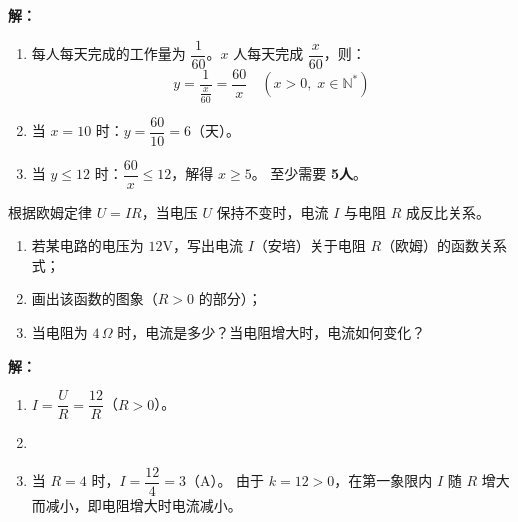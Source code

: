 \documentclass[12pt, a4paper]{ctexart}
\begin{document}
\textbf{解：}
\begin{enumerate}[label=(\arabic*)]
  \item 每人每天完成的工作量为 $\dfrac{1}{60}$。$x$ 人每天完成 $\dfrac{x}{60}$，则：
  \[
    y = \frac{1}{\frac{x}{60}} = \frac{60}{x} \quad (x > 0, \; x \in \mathbb{N}^*)
  \]

  \item 当 $x = 10$ 时：$y = \dfrac{60}{10} = 6$（天）。

  \item 当 $y \leqslant 12$ 时：$\dfrac{60}{x} \leqslant 12$，解得 $x \geqslant 5$。
  至少需要 \textbf{5人}。
\end{enumerate}

\begin{appbox}[【应用3】电路问题]
根据欧姆定律 $U = IR$，当电压 $U$ 保持不变时，电流 $I$ 与电阻 $R$ 成反比关系。
\begin{enumerate}[label=(\arabic*)]
  \item 若某电路的电压为 $12\text{V}$，写出电流 $I$（安培）关于电阻 $R$（欧姆）的函数关系式；
  \item 画出该函数的图象（$R > 0$ 的部分）；
  \item 当电阻为 $4\,\Omega$ 时，电流是多少？当电阻增大时，电流如何变化？
\end{enumerate}
\end{appbox}

\textbf{解：}
\begin{enumerate}[label=(\arabic*)]
  \item $I = \dfrac{U}{R} = \dfrac{12}{R}$（$R > 0$）。

  \item
  \begin{center}
  \end{center}

  \item 当 $R = 4$ 时，$I = \dfrac{12}{4} = 3$（A）。
  由于 $k = 12 > 0$，在第一象限内 $I$ 随 $R$ 增大而减小，即电阻增大时电流减小。
\end{enumerate}
\end{document}
